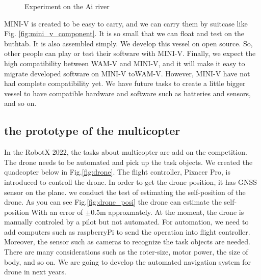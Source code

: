 \documentclass[lettersize,journal]{IEEEtran}
\begin{document}
\begin{figure}[htbp]
    \begin{center}
    \end{center}
    \caption{Experiment on the Ai river}
    \label{fig:mini_v_experiment}
  \end{figure}

MINI-V is created to be easy to carry, and we can carry them by suitcase like Fig. \ref{fig:mini_v_component}. It is so small that we can
float and test on the buthtab.
It is also assembled simply. We develop this vessel on open source. So, other people can play or test their software with MINI-V. Finally,
we expect the high compatibility between WAM-V and MINI-V, and it will make it easy to migrate developed software on MINI-V toWAM-V. However, 
MINI-V have not had complete compatibility yet.
We have future tasks to create a little bigger vessel to have compatible hardware and software such as batteries and sensors, and so on.

\subsection{the prototype of the multicopter}
In the RobotX 2022, the tasks about multicopter are add on the competition. The drone needs to be automated and pick up the task objects.
We created the quadcopter below in Fig.\ref{fig:drone}.
The flight controller, Pixacer Pro\cite{pixracer}, is introduced to controll the drone. 
In order to get the drone position, it has GNSS sensor on the plane.
we conduct the test of estimating the self-position of the drone. As you can see Fig.\ref{fig:drone_posi} the drone can estimate
the self-position With an error of $\pm 0.5 \mathrm{m}$ approxmately.
At the moment, the drone is manually controled by a pilot but not automated.
For automation, we need to add computers such as raspberryPi to send the operation into flight controller. 
Moreover, the sensor such as cameras to recognize the task objects are needed.
There are many considerations such as the roter-size, motor power, the size of body, and so on.
We are going to develop the automated navigation system for drone in next years.
\end{document}
